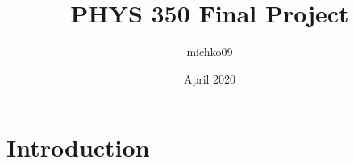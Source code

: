 \documentclass{article}
\title{PHYS 350 Final Project}
\author{michko09 }
\date{April 2020}
\begin{document}
\maketitle

\section{Introduction}
\end{document}

